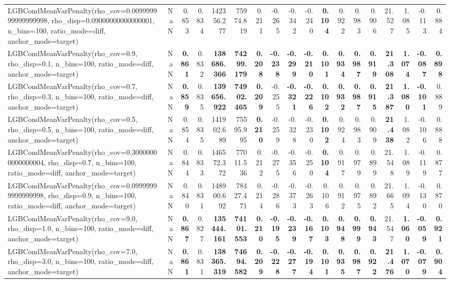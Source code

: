 \documentclass[11pt]{article}
\theoremstyle{plain}
\theoremstyle{definition}
\newcommand{\1}{\mathbf{1}}
\begin{document}
\begin{table}[htbp]
{\begin{tabular}{lrrrrrrrrrrrrrrrrr}
LGBCondMeanVarPenalty(rho\_cov=0.009999999999999998, rho\_disp=0.09000000000000001, n\_bins=100, ratio\_mode=diff, anchor\_mode=target) & NaN & 0.853 & 0.834 & 142356.277 & 75974.819 & 0.211 & -0.265 & -0.342 & -0.240 & \textbf{0.104} & 0.922 & 0.983 & 0.906 & 21.527 & 1.085 & -0.113 & 0.884 \\
LGBCondMeanVarPenalty(rho\_cov=0.9, rho\_disp=0.1, n\_bins=100, ratio\_mode=diff, anchor\_mode=target) & NaN & \textbf{0.861} & 0.832 & \textbf{138686.366} & \textbf{74299.179} & \textbf{0.208} & \textbf{-0.238} & \textbf{-0.299} & \textbf{-0.210} & \textbf{0.101} & \textbf{0.934} & \textbf{0.987} & \textbf{0.919} & \textbf{21.308} & \textbf{1.074} & \textbf{-0.087} & \textbf{0.898} \\
LGBCondMeanVarPenalty(rho\_cov=0.7, rho\_disp=0.3, n\_bins=100, ratio\_mode=diff, anchor\_mode=target) & NaN & \textbf{0.859} & 0.835 & \textbf{139656.922} & \textbf{74902.465} & \textbf{0.209} & -0.255 & \textbf{-0.321} & \textbf{-0.226} & \textbf{0.102} & \textbf{0.932} & \textbf{0.987} & \textbf{0.915} & \textbf{21.387} & \textbf{1.080} & \textbf{-0.101} & 0.889 \\
LGBCondMeanVarPenalty(rho\_cov=0.5, rho\_disp=0.5, n\_bins=100, ratio\_mode=diff, anchor\_mode=target) & NaN & 0.854 & 0.835 & 141902.689 & 75595.995 & \textbf{0.210} & -0.259 & -0.328 & -0.230 & \textbf{0.102} & 0.924 & 0.983 & 0.909 & \textbf{21.438} & 1.082 & -0.106 & 0.888 \\
LGBCondMeanVarPenalty(rho\_cov=0.30000000000000004, rho\_disp=0.7, n\_bins=100, ratio\_mode=diff, anchor\_mode=target) & NaN & 0.844 & 0.833 & 146572.372 & 77011.536 & 0.212 & -0.275 & -0.356 & -0.250 & \textbf{0.104} & 0.917 & 0.979 & 0.899 & 21.548 & 1.089 & -0.119 & 0.877 \\
LGBCondMeanVarPenalty(rho\_cov=0.09999999999999998, rho\_disp=0.9, n\_bins=100, ratio\_mode=diff, anchor\_mode=target) & NaN & 0.840 & 0.831 & 148900.692 & 78427.471 & 0.214 & -0.286 & -0.373 & -0.263 & 0.106 & 0.912 & 0.975 & 0.892 & 21.665 & 1.094 & -0.130 & 0.870 \\
LGBCondMeanVarPenalty(rho\_cov=9.0, rho\_disp=1.0, n\_bins=100, ratio\_mode=diff, anchor\_mode=target) & NaN & \textbf{0.867} & 0.827 & \textbf{135444.161} & \textbf{74101.553} & \textbf{0.210} & \textbf{-0.195} & \textbf{-0.239} & \textbf{-0.167} & \textbf{0.103} & \textbf{0.948} & \textbf{0.999} & \textbf{0.943} & 21.547 & \textbf{1.060} & \textbf{-0.059} & \textbf{0.921} \\
LGBCondMeanVarPenalty(rho\_cov=7.0, rho\_disp=3.0, n\_bins=100, ratio\_mode=diff, anchor\_mode=target) & NaN & \textbf{0.861} & 0.831 & \textbf{138365.319} & \textbf{74694.582} & \textbf{0.209} & \textbf{-0.228} & \textbf{-0.277} & \textbf{-0.194} & \textbf{0.101} & \textbf{0.935} & \textbf{0.987} & \textbf{0.922} & \textbf{21.476} & \textbf{1.070} & \textbf{-0.079} & \textbf{0.904} \\

\end{tabular}}
\end{table}
\end{document}
